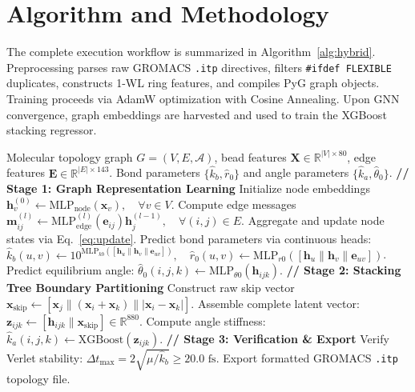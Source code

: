 \documentclass[10pt,journal,compsoc]{IEEEtran}
\begin{document}
\section{Algorithm and Methodology}
\label{sec:algorithm}

The complete execution workflow is summarized in Algorithm~\ref{alg:hybrid}. Preprocessing parses raw GROMACS \texttt{.itp} directives, filters \texttt{\#ifdef FLEXIBLE} duplicates, constructs 1-WL ring features, and compiles PyG graph objects. Training proceeds via AdamW optimization with Cosine Annealing. Upon GNN convergence, graph embeddings are harvested and used to train the XGBoost stacking regressor.

\begin{algorithm}[t]
\caption{End-to-End GNN-Tree Stacking Pipeline}
\label{alg:hybrid}
\begin{algorithmic}[1]
\Require Molecular topology graph $G = (V, E, \mathcal{A})$, bead features $\mathbf{X} \in \mathbb{R}^{|V| \times 80}$, edge features $\mathbf{E} \in \mathbb{R}^{|E| \times 143}$.
\Ensure Bond parameters $\{\hat{k}_b, \hat{r}_0\}$ and angle parameters $\{\hat{k}_a, \hat{\theta}_0\}$.
\State \textbf{// Stage 1: Graph Representation Learning}
\State Initialize node embeddings $\mathbf{h}_v^{(0)} \gets \text{MLP}_{\text{node}}(\mathbf{x}_v), \quad \forall v \in V$.
    \State Compute edge messages $\mathbf{m}_{ij}^{(l)} \gets \text{MLP}_{\text{edge}}^{(l)}(\mathbf{e}_{ij}) \mathbf{h}_j^{(l-1)}, \quad \forall (i, j) \in E$.
    \State Aggregate and update node states via Eq.~\eqref{eq:update}.
\EndFor
\State Predict bond parameters via continuous heads:
\State $\hat{k}_b(u, v) \gets 10^{\text{MLP}_{kb}([\mathbf{h}_u \parallel \mathbf{h}_v \parallel \mathbf{e}_{uv}])}, \quad \hat{r}_0(u, v) \gets \text{MLP}_{r0}([\mathbf{h}_u \parallel \mathbf{h}_v \parallel \mathbf{e}_{uv}])$.
\State Predict equilibrium angle: $\hat{\theta}_0(i, j, k) \gets \text{MLP}_{\theta0}(\mathbf{h}_{ijk})$.
\State \textbf{// Stage 2: Stacking Tree Boundary Partitioning}
\State Construct raw skip vector $\mathbf{x}_{\text{skip}} \gets [\mathbf{x}_j \parallel (\mathbf{x}_i + \mathbf{x}_k) \parallel |\mathbf{x}_i - \mathbf{x}_k|]$.
\State Assemble complete latent vector: $\mathbf{z}_{ijk} \gets [\mathbf{h}_{ijk} \parallel \mathbf{x}_{\text{skip}}] \in \mathbb{R}^{880}$.
\State Compute angle stiffness: $\hat{k}_a(i, j, k) \gets \text{XGBoost}(\mathbf{z}_{ijk})$.
\State \textbf{// Stage 3: Verification \& Export}
\State Verify Verlet stability: $\Delta t_{\max} = 2\sqrt{\mu / \hat{k}_b} \ge 20.0\text{ fs}$.
\State Export formatted GROMACS \texttt{.itp} topology file.
\end{algorithmic}
\end{algorithm}
\end{document}
